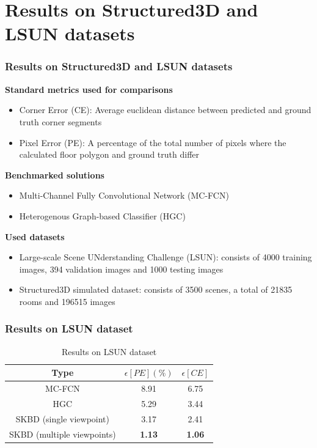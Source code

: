 \documentclass{beamer}
\begin{document}
\section{Results on Structured3D and LSUN datasets}
\begin{frame}
\frametitle{Results on Structured3D and LSUN datasets}
\textbf{Standard metrics used for comparisons}
\begin{itemize}
    \item Corner Error (CE): Average euclidean distance between predicted and ground truth corner segments
    \item Pixel Error (PE): A percentage of the total number of pixels where the calculated floor polygon and ground truth differ
\end{itemize}
\textbf{Benchmarked solutions}
\begin{itemize}
    \item Multi-Channel Fully Convolutional Network (MC-FCN)
    \item Heterogenous Graph-based Classifier (HGC)
\end{itemize}
\textbf{Used datasets}
\begin{itemize}
    \item Large-scale Scene UNderstanding Challenge (LSUN): consists of 4000 training images, 394 validation images and 1000 testing images
    \item Structured3D simulated dataset: consists of 3500 scenes, a total of 21835 rooms and 196515 images
\end{itemize}
\end{frame}

\begin{frame}
\frametitle{Results on LSUN dataset}
\begin{table}[H]
\centering
\begin{tabular}{|c | c c |}
    \hline
    Type & $\epsilon[PE](\%)$ & $\epsilon[CE]$ \\ [0.5 ex]
    \hline\hline
    MC-FCN & 8.91 & 6.75 \\
    HGC & 5.29 & 3.44 \\
    SKBD (single viewpoint) & 3.17 & 2.41 \\
    \hline
    SKBD (multiple viewpoints) & \textbf{1.13} & \textbf{1.06} \\
    \hline
\end{tabular}
\caption{Results on LSUN dataset}
\label{table:lsunperf}
\end{table}
\end{frame}
\end{document}
